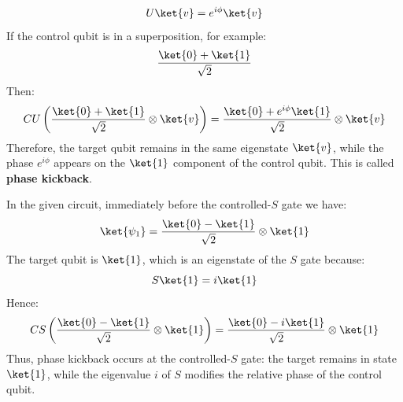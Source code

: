 \begin{equation*}
    U\ket{v}=e^{i\phi}\ket{v}
\end{equation*}
If the control qubit is in a superposition, for example:
\begin{equation*}
    \frac{\ket{0}+\ket{1}}{\sqrt{2}}
\end{equation*}
Then:
\begin{equation*}
    CU
    \left(
        \frac{\ket{0}+\ket{1}}{\sqrt{2}}
        \otimes \ket{v}
    \right)
    =
    \frac{\ket{0}+e^{i\phi}\ket{1}}{\sqrt{2}}
    \otimes \ket{v}
\end{equation*}
Therefore, the target qubit remains in the same eigenstate $\ket{v}$, while the phase $e^{i\phi}$ appears on the $\ket{1}$ component of the control qubit. This is called \textbf{phase kickback}.

\highspace
In the given circuit, immediately before the controlled-$S$ gate we have:
\begin{equation*}
    \ket{\psi_1}
    =
    \frac{\ket{0}-\ket{1}}{\sqrt{2}}
    \otimes \ket{1}
\end{equation*}
The target qubit is $\ket{1}$, which is an eigenstate of the $S$ gate because:
\begin{equation*}
    S\ket{1}=i\ket{1}
\end{equation*}
Hence:
\begin{equation*}
    CS
    \left(
        \frac{\ket{0}-\ket{1}}{\sqrt{2}}
        \otimes \ket{1}
    \right)
    =
    \frac{\ket{0}-i\ket{1}}{\sqrt{2}}
    \otimes \ket{1}
\end{equation*}
Thus, phase kickback occurs at the controlled-$S$ gate: the target remains in state $\ket{1}$, while the eigenvalue $i$ of $S$ modifies the relative phase of the control qubit.